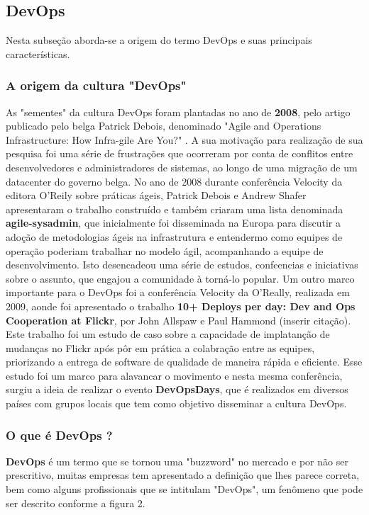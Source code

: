 \documentclass[twoside,english,brazilian]{UNISINOSartigo}
\begin{document}
\subsection{DevOps}
Nesta subseção aborda-se a origem do termo DevOps e suas principais características.

\subsubsection{A origem da cultura "DevOps"}
As "sementes" da cultura DevOps foram plantadas no ano de \textbf{2008}, pelo artigo publicado pelo belga  Patrick Debois, denominado "Agile and Operations Infrastructure: How Infra-gile Are You?" \citep{Debois2008}. A sua motivação para realização de sua pesquisa foi uma série de frustrações que ocorreram por conta de conflitos entre desenvolvedores e administradores de sistemas, ao longo de uma migração de um datacenter do governo belga.  No ano de 2008 durante conferência Velocity da editora O'Reily sobre práticas ágeis, Patrick Debois e Andrew Shafer apresentaram o trabalho construído e também criaram uma lista denominada \textbf{agile-sysadmin}, que inicialmente foi disseminada na Europa para discutir a adoção de metodologias ágeis na infrastrutura e entendermo como equipes de operação poderiam trabalhar no modelo ágil, acompanhando a equipe de desenvolvimento. Isto desencadeou uma série de estudos, confeencias e iniciativas sobre o assunto, que engajou a comunidade à torná-lo popular. 
Um outro marco importante para o DevOps foi a conferência Velocity da O'Really, realizada em 2009, aonde foi apresentado o trabalho \textbf{10+ Deploys per day: Dev and Ops Cooperation at Flickr}, por John Allspaw e Paul Hammond (inserir citação). Este trabalho foi um estudo de caso sobre a capacidade de implatanção de mudanças no Flickr após pôr em prática a colabração entre as equipes, priorizando a entrega de software de qualidade de maneira rápida e eficiente.
Esse estudo foi um marco para alavancar o movimento e nesta mesma conferência, surgiu a ideia de realizar o evento \textbf{DevOpsDays}, que é realizados em diversos países com grupos locais que tem como objetivo disseminar a cultura DevOps.

\subsubsection{O que é DevOps ?}

\textbf{DevOps} é um termo que se tornou uma "buzzword" no mercado e  por não ser prescritivo, muitas empresas tem apresentado a definição que lhes parece correta, bem como alguns profissionais que se intitulam "DevOps", um fenômeno que pode ser descrito conforme a figura 2.
\end{document}
